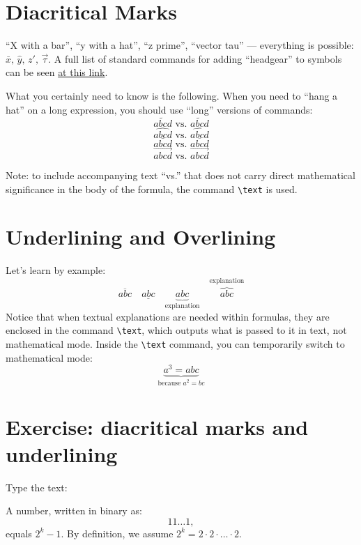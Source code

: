 \section{Diacritical Marks}
\par ``X with a bar'', ``y with a hat'', ``z prime'', ``vector tau'' --- everything is possible: \(\bar{x},\, \hat{y},\, z',\, \vec{\tau}\). A full list of standard commands for adding ``headgear'' to symbols can be seen \href{https://en.wikibooks.org/wiki/LaTeX/Special_Characters#Math_mode}{at this link}.
\par What you certainly need to know is the following. When you need to ``hang a hat'' on a long expression, you should use ``long'' versions of commands:\index{\hat=\widehat,\vec=\overrightarrow,\tilde=\widetilde}
\[\tilde{abcd} \text{ vs. } \widetilde{abcd}\]
\[\hat{abcd} \text{ vs. } \widehat{abcd}\]
\[\bar{abcd} \text{ vs. } \overline{abcd}\]
\[\vec{abcd} \text{ vs. } \overrightarrow{abcd}\]
\par Note: to include accompanying text ``vs.'' that does not carry direct mathematical significance in the body of the formula, the command \verb"\text" is used.

\section{Underlining and Overlining}
\par Let's learn by example: \[\overline{abc}\quad \underline{abc}\quad \underbrace{abc}_{\text{explanation}} \quad \overbrace{abc}^{\text{explanation}}\]
Notice that when textual explanations are needed within formulas, they are enclosed in the command \verb"\text", which outputs what is passed to it in text, not mathematical mode. Inside the \verb"\text" command, you can temporarily switch to mathematical mode:
\[ \underbrace{a^3=abc}_{\text{because \(a^2=bc\)}} \]

\section{Exercise: diacritical marks and underlining}
\begin{staticpart}
Type the text: 
\end{staticpart}
\par A number, written in binary as: \[11\ldots 1,\] equals \(2^k-1\).
By definition, we assume \(2^k=2 \cdot 2 \cdot\ldots\cdot 2\).

